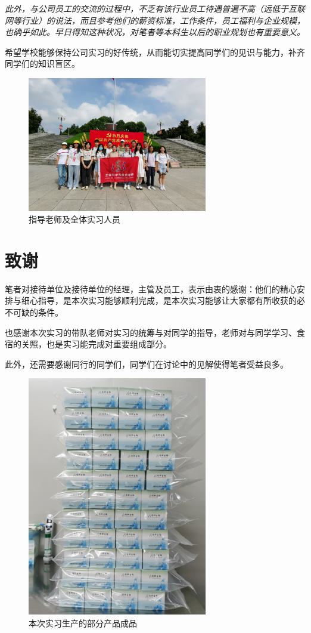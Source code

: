 \documentclass[cn,black,12pt,normal]{elegantnote}
\begin{document}
\textit{此外，与公司员工的交流的过程中，不乏有该行业员工待遇普遍不高（远低于互联网等行业）的说法，而且参考他们的薪资标准，工作条件，员工福利与企业规模，也确乎如此。早日得知这种状况，对笔者等本科生以后的职业规划也有重要意义。}

希望学校能够保持公司实习的好传统，从而能切实提高同学们的见识与能力，补齐同学们的知识盲区。

\begin{figure}[H]
    \centering
    \includegraphics[width=0.7\textwidth]{image/WechatIMG110.jpeg}
    \caption{指导老师及全体实习人员}
    \label{STAFF1}
\end{figure}
\section*{致谢} 

笔者对接待单位及接待单位的经理，主管及员工，表示由衷的感谢：他们的精心安排与细心指导，是本次实习能够顺利完成，是本次实习能够让大家都有所收获的必不可缺的条件。

也感谢本次实习的带队老师对实习的统筹与对同学的指导，老师对与同学学习、食宿的关照，也是实习能完成对重要组成部分。

此外，还需要感谢同行的同学们，同学们在讨论中的见解使得笔者受益良多。

\begin{figure}[H]
    \centering
    \includegraphics[width=0.7\textwidth]{image/WechatIMG92.jpeg}
    \caption{本次实习生产的部分产品成品}
    \label{STAFF2}
\end{figure}
\end{document}
